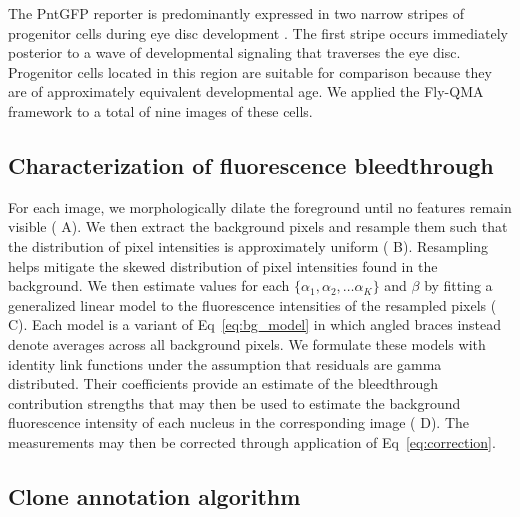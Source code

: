 \documentclass[10pt,letterpaper]{article}
\begin{document}
The PntGFP reporter is predominantly expressed in two narrow stripes of progenitor cells during eye disc development \cite{Bernasek2018}. The first stripe occurs immediately posterior to a wave of developmental signaling that traverses the eye disc. Progenitor cells located in this region are suitable for comparison because they are of approximately equivalent developmental age. We applied the Fly-QMA framework to a total of nine images of these cells.


\subsection*{Characterization of fluorescence bleedthrough}

For each image, we morphologically dilate the foreground until no features remain visible (  A). We then extract the background pixels and resample them such that the distribution of pixel intensities is approximately uniform (  B). Resampling helps mitigate the skewed distribution of pixel intensities found in the background. We then estimate values for each $\{\alpha_1, \alpha_2, \ldots \alpha_K\}$ and $\beta$ by fitting a generalized linear model to the fluorescence intensities of the resampled pixels ( C). Each model is a variant of Eq~\ref{eq:bg_model} in which angled braces instead denote averages across all background pixels. We formulate these models with identity link functions under the assumption that residuals are gamma distributed. Their coefficients provide an estimate of the bleedthrough contribution strengths that may then be used to estimate the background fluorescence intensity of each nucleus in the corresponding image ( D). The measurements may then be corrected through application of Eq~\ref{eq:correction}. 

\subsection*{Clone annotation algorithm} 
\end{document}
